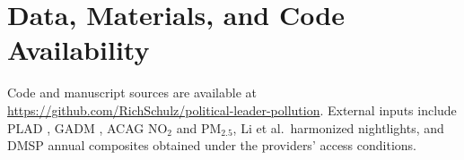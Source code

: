 \documentclass[9pt,twocolumn,twoside]{pnas-new}
\providecommand{\dataavail}[1]{\section*{Data, Materials, and Code Availability}#1}
\providecommand{\bibsplit}[1][]{}
\begin{document}
\showmatmethods{}

\dataavail{Code and manuscript sources are available at \url{https://github.com/RichSchulz/political-leader-pollution}. External inputs include PLAD \cite{Bomprezzi2025PLAD}, GADM \cite{GADM2022}, ACAG NO$_2$ \cite{Cooper2022NO2} and PM$_{2.5}$, Li et al.\ harmonized nightlights, and DMSP annual composites obtained under the providers' access conditions.}

\showacknow{}

\bibsplit[3]


\end{document}
